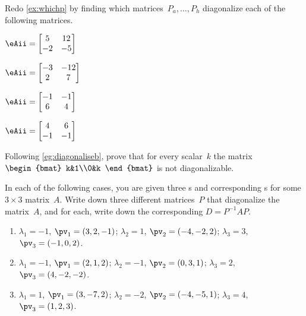 \begin{exercise} \label{ex:whichps} 
Redo \cref{ex:whichp} by finding which matrices~\(P_a,\ldots,P_h\) diagonalize each of the following matrices.
\begin{Parts}
\item \(\eAii=\begin{bmatrix} 5&12\\-2&-5 \end{bmatrix}\)
\item \(\eAii=\begin{bmatrix} -3&-12\\2&7 \end{bmatrix}\)
\item \(\eAii=\begin{bmatrix} -1&-1\\6&4 \end{bmatrix}\)
\item \(\eAii=\begin{bmatrix} 4&6\\-1&-1 \end{bmatrix}\)
\end{Parts}
\end{exercise}




\begin{exercise}  
Following \cref{eg:diagonaliseb}, prove that for every scalar~\(k\) the matrix \(\begin{bmat} k&1\\0&k \end{bmat}\) is not diagonalizable.
\end{exercise}




\begin{exercise}  
In each of the following cases, you are given three  s and corresponding s for some \(3\times3\) matrix~\(A\).
Write down three different matrices~\(P\) that diagonalize the matrix~\(A\), and for each, write down the corresponding  \(D=P^{-1}AP\).
\begin{enumerate}
\item \(\lambda_1=-1\), \(\pv_1=(3,2,-1)\);
\(\lambda_2=1\), \(\pv_2=(-4,-2,2)\);
\(\lambda_3=3\), \(\pv_3=(-1,0,2)\).

\item \(\lambda_1=-1\), \(\pv_1=( 2,1,2)\);
\(\lambda_2=-1\), \(\pv_2=(0,3,1)\);
\(\lambda_3=2\), \(\pv_3=(4,-2,-2)\).

\item \(\lambda_1=1\), \(\pv_1=(3,-7,2)\);
\(\lambda_2=-2\), \(\pv_2=(-4,-5,1)\);
\(\lambda_3=4\), \(\pv_3=(1,2,3)\).


\end{enumerate}
\end{exercise}





